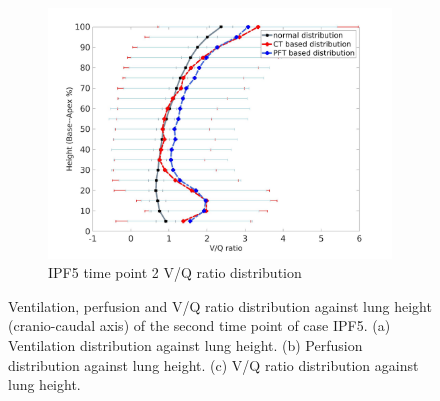 \begin{figure}[htbp]
\begin{subfigure}{.6\linewidth}
  \includegraphics[width=\linewidth,trim={{.0\wd0} {.0\wd0} {.0\wd0} {.0\wd0}},clip]{Appendix/Image_AppexB/IPF501/IPF501_VQAgainstLungHeight.jpg}
  \caption{IPF5 time point 2 V/Q ratio distribution}
  \label{fig:IPF501VQDistribution-c}
\end{subfigure}
\caption{ Ventilation, perfusion and V/Q ratio distribution against lung height (cranio-caudal axis) of the second time point of case IPF5. (a) Ventilation distribution against lung height. (b) Perfusion distribution against lung height. (c) V/Q ratio distribution against lung height.}
\label{fig:IPF501VQDistribution}
\end{figure}

